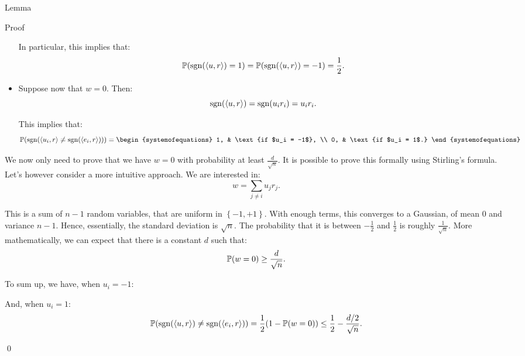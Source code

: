 \documentclass[a4paper]{article}
\begin{document}
\begin{parag}{Lemma}
\begin{subparag}{Proof}
\begin{itemize}[left=0pt]
            In particular, this implies that: 
            \[\prob\left(\sgn\left(\left\langle u, r \right\rangle\right) = 1\right) = \prob\left(\sgn\left(\left\langle u, r \right\rangle\right) = -1\right) = \frac{1}{2}.\]
            
            \item Suppose now that $w = 0$. Then: 
            \[\sgn\left(\left\langle u, r \right\rangle\right) = \sgn\left(u_i r_i\right) = u_i r_i.\]

            This implies that: 
            \[\prob\left(\sgn\left(\left\langle u_i, r \right\rangle \neq \sgn\left(\left\langle e_i, r \right\rangle\right)\right)\right) = \begin{systemofequations} 1, & \text{if $u_i = -1$}, \\ 0, & \text{if $u_i = 1$.} \end{systemofequations}\]
        \end{itemize}

        We now only need to prove that we have $w = 0$ with probability at least $\frac{d}{\sqrt{n}}$. It is possible to prove this formally using Stirling's formula. Let's however consider a more intuitive approach. We are interested in:
        \[w = \sum_{j \neq i} u_j r_j.\]

        This is a sum of $n-1$ random variables, that are uniform in $\left\{-1, +1\right\}$. With enough terms, this converges to a Gaussian, of mean $0$ and variance $n-1$. Hence, essentially, the standard deviation is $\sqrt{n}$. The probability that it is between $-\frac{1}{2}$ and $\frac{1}{2}$ is roughly $\frac{1}{\sqrt{n}}$. More mathematically, we can expect that there is a constant $d$ such that:
        \[\prob\left(w = 0\right) \geq \frac{d}{\sqrt{n}}.\]
        
        To sum up, we have, when $u_i = -1$:

        And, when $u_i = 1$: 
        \[\prob\left(\sgn\left(\left\langle u, r \right\rangle\right) \neq \sgn\left(\left\langle e_i, r \right\rangle\right)\right) = \frac{1}{2}\left(1 - \prob\left(w = 0\right)\right) \leq \frac{1}{2} - \frac{d/2}{\sqrt{n}}.\]
        
        \qed
    \end{subparag}
\end{parag}
\end{document}
